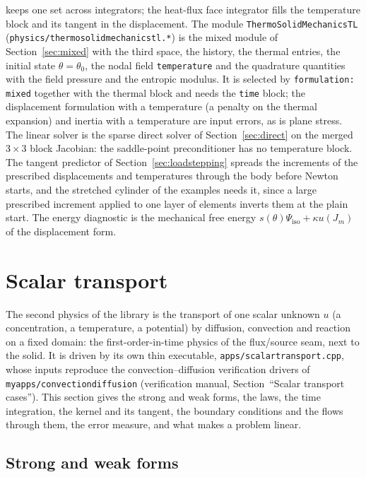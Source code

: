 \documentclass[11pt]{article}
\DeclareRobustCommand{\code}[1]{{\def\_{\textunderscore\allowbreak}\texttt{#1}}}
\DeclareRobustCommand{\file}[1]{{\def\_{\textunderscore\allowbreak}\texttt{#1}}}
\begin{document}
keeps one set across integrators; the heat-flux face integrator fills the
temperature block and its tangent in the displacement.  The module
\code{ThermoSolidMechanicsTL} (\file{physics/thermo\_solid\_mechanics\_tl.*})
is the mixed module of Section~\ref{sec:mixed} with the third space, the
history, the thermal entries, the initial state $\theta = \theta_0$, the
nodal field \code{temperature} and the quadrature quantities with the
field pressure and the entropic modulus.  It is selected by
\code{formulation: mixed} together with the thermal block and needs the
\code{time} block; the displacement formulation with a temperature (a
penalty on the thermal expansion) and inertia with a temperature are input
errors, as is plane stress.  The linear solver is the sparse direct solver
of Section~\ref{sec:direct} on the merged $3\times3$ block Jacobian: the
saddle-point preconditioner has no temperature block.  The tangent
predictor of Section~\ref{sec:loadstepping} spreads the increments of the
prescribed displacements and temperatures through the body before Newton
starts, and the stretched cylinder of the examples needs it, since a large
prescribed increment applied to one layer of elements inverts them at the
plain start.  The energy diagnostic is the mechanical free energy
$s(\theta)\Psi_{\mathrm{iso}} + \kappa u(J_m)$ of the displacement form.

\section{Scalar transport}
\label{sec:scalar}

The second physics of the library is the transport of one scalar unknown
$u$ (a concentration, a temperature, a potential) by diffusion, convection
and reaction on a fixed domain: the first-order-in-time physics of the
flux/source seam, next to the solid.  It is driven by its own thin
executable, \file{apps/scalar\_transport.cpp}, whose inputs reproduce the
convection--diffusion verification drivers of \file{myapps/convection\_diffusion}
(verification manual, Section~``Scalar transport cases'').  This section
gives the strong and weak forms, the laws, the time integration, the kernel
and its tangent, the boundary conditions and the flows through them, the
error measure, and what makes a problem linear.

\subsection{Strong and weak forms}
\end{document}
